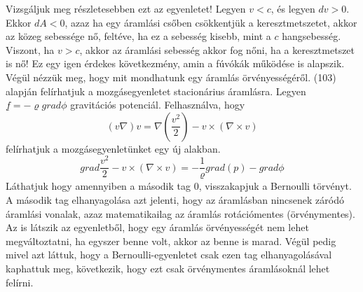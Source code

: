 \documentclass[a4paper,12pt]{article}
\begin{document}
Vizsgáljuk meg részletesebben ezt az egyenletet! Legyen $v<c$, és legyen $dv>0$. Ekkor $dA<0$, azaz ha egy áramlási csőben csökkentjük a keresztmetszetet, akkor az közeg sebessége nő, feltéve, ha ez a sebesség kisebb, mint a $c$ hangsebesség. Viszont, ha $v>c$, akkor az áramlási sebesség akkor fog nőni, ha a keresztmetszet is nő! Ez egy igen érdekes következmény, amin a fúvókák működése is alapszik.
Végül nézzük meg, hogy mit mondhatunk egy áramlás örvényességéről. (103) alapján felírhatjuk a mozgásegyenletet stacionárius áramlásra. Legyen $\underline{f}=-\varrho grad\phi$ gravitációs potenciál. Felhasználva, hogy
\begin{equation}
(v\nabla)v=\nabla\left(\frac{v^2}{2}\right)-v\times(\nabla\times v)
\end{equation}
felírhatjuk a mozgásegyenletünket egy új alakban.
\begin{equation}
grad\frac{v^2}{2}-v\times(\nabla\times v)=-\frac{1}{\varrho}grad(p)-grad\phi
\end{equation}
Láthatjuk hogy amennyiben a második tag 0, visszakapjuk a Bernoulli törvényt. A második tag elhanyagolása azt jelenti, hogy az áramlásban nincsenek záródó áramlási vonalak, azaz matematikailag az áramlás rotációmentes (örvénymentes). Az is látszik az egyenletből, hogy egy áramlás örvényességét nem lehet megváltoztatni, ha egyszer benne volt, akkor az benne is marad. Végül pedig mivel azt láttuk, hogy a Bernoulli-egyenletet csak ezen tag elhanyagolásával kaphattuk meg, következik, hogy ezt csak örvénymentes áramlásoknál lehet felírni.
\pagebreak
\end{document}
